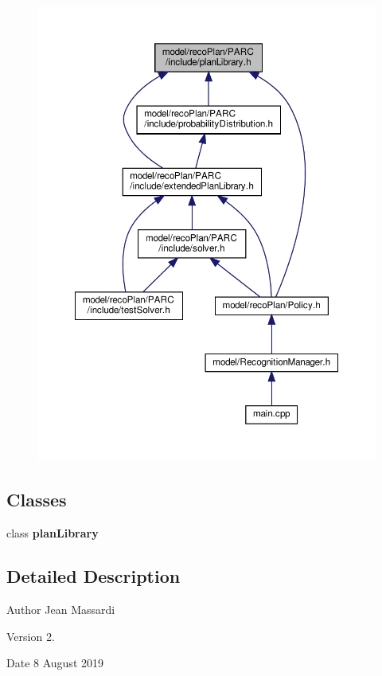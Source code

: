 \begin{figure}[H]
\begin{center}
\leavevmode
\includegraphics[width=350pt]{plan_library_8h__dep__incl}
\end{center}
\end{figure}
\subsection*{Classes}
\begin{DoxyCompactItemize}
\item 
class \textbf{ plan\+Library}
\end{DoxyCompactItemize}


\subsection{Detailed Description}
\begin{DoxyAuthor}{Author}
Jean Massardi 
\end{DoxyAuthor}
\begin{DoxyVersion}{Version}
2. 
\end{DoxyVersion}
\begin{DoxyDate}{Date}
8 August 2019 
\end{DoxyDate}
